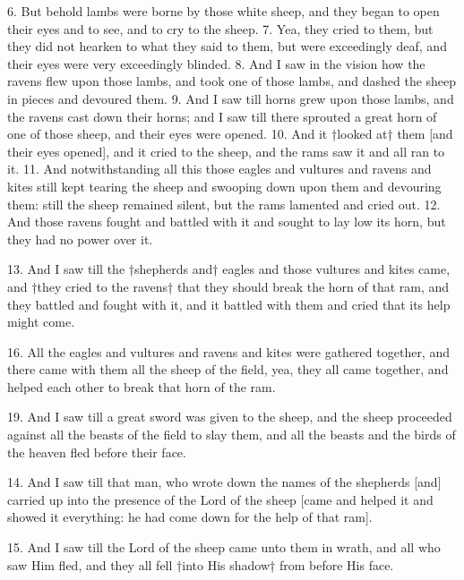 
6. But behold lambs were borne by those white
sheep, and they began to open their eyes and to see,
and to cry to the sheep. 7. Yea, they cried to them,
but they did not hearken to what they said to them,
but were exceedingly deaf, and their eyes were very
exceedingly blinded. 8. And I saw in the vision how
the ravens flew upon those lambs, and took one of
those lambs, and dashed the sheep in pieces and
devoured them. 9. And I saw till horns grew upon
those lambs, and the ravens cast down their horns;
and I saw till there sprouted a great horn of one of
those sheep, and their eyes were opened. 10. And
it †looked at† them [and their eyes opened], and it
cried to the sheep, and the rams saw it and all ran to
it. 11. And notwithstanding all this those eagles
and vultures and ravens and kites still kept tearing
the sheep and swooping down upon them and devouring
them: still the sheep remained silent, but
the rams lamented and cried out. 12. And those
ravens fought and battled with it and sought to lay
low its horn, but they had no power over it.


13. And I saw till the
†shepherds and† eagles
and those vultures and
kites came, and †they
cried to the ravens† that
they should break the
horn of that ram, and
they battled and fought
with it, and it battled
with them and cried that
its help might come.

16. All the eagles and
vultures and ravens and
kites were gathered together,
and there came
with them all the sheep
of the field, yea, they all
came together, and helped
each other to break that
horn of the ram.

19. And I saw till a great sword was given to the
sheep, and the sheep proceeded against all the beasts
of the field to slay them, and all the beasts and the
birds of the heaven fled before their face.

14. And I saw till that
man, who wrote down the
names of the shepherds
[and] carried up into the
presence of the Lord of
the sheep [came and
helped it and showed it
everything: he had come
down for the help of that
ram].

15. And I saw till the
Lord of the sheep came
unto them in wrath, and
all who saw Him fled,
and they all fell †into His
shadow† from before His
face.

